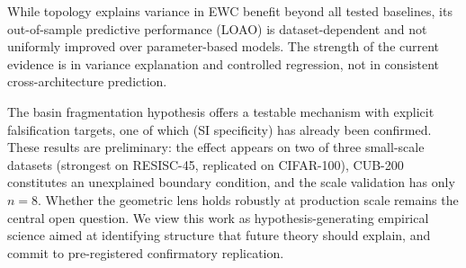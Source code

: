 \documentclass{article}
\begin{document}
While topology explains variance in EWC benefit beyond all tested baselines, its out-of-sample predictive performance (LOAO) is dataset-dependent and not uniformly improved over parameter-based models. The strength of the current evidence is in variance explanation and controlled regression, not in consistent cross-architecture prediction.

The basin fragmentation hypothesis offers a testable mechanism with explicit falsification targets, one of which (SI specificity) has already been confirmed. These results are preliminary: the effect appears on two of three small-scale datasets (strongest on RESISC-45, replicated on CIFAR-100), CUB-200 constitutes an unexplained boundary condition, and the scale validation has only $n = 8$. Whether the geometric lens holds robustly at production scale remains the central open question. We view this work as hypothesis-generating empirical science aimed at identifying structure that future theory should explain, and commit to pre-registered confirmatory replication.



\end{document}
